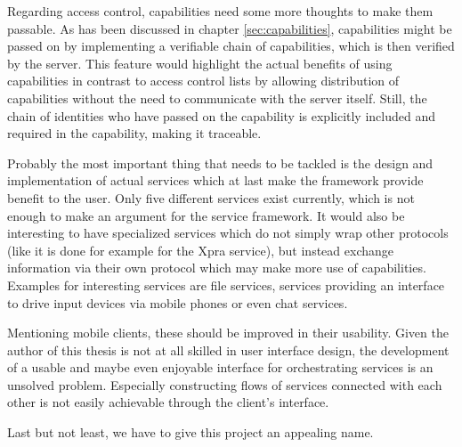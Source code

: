 Regarding access control, capabilities need some more thoughts to make them passable.
As has been discussed in chapter \ref{sec:capabilities}, capabilities might be passed on by implementing a verifiable chain of capabilities, which is then verified by the server.
This feature would highlight the actual benefits of using capabilities in contrast to access control lists by allowing distribution of capabilities without the need to communicate with the server itself.
Still, the chain of identities who have passed on the capability is explicitly included and required in the capability, making it traceable.

Probably the most important thing that needs to be tackled is the design and implementation of actual services which at last make the framework provide benefit to the user.
Only five different services exist currently, which  is not enough to make an argument for the service framework.
It would also be interesting to have specialized services which do not simply wrap other protocols (like it is done for example for the Xpra service), but instead exchange information via their own protocol which may make more use of capabilities.
Examples for interesting services are file services, services providing an interface to drive input devices via mobile phones or even chat services.

Mentioning mobile clients, these should be improved in their usability.
Given the author of this thesis is not at all skilled in user interface design, the development of a usable and maybe even enjoyable interface for orchestrating services is an unsolved problem.
Especially constructing flows of services connected with each other is not easily achievable through the client's interface.

Last but not least, we have to give this project an appealing name.

